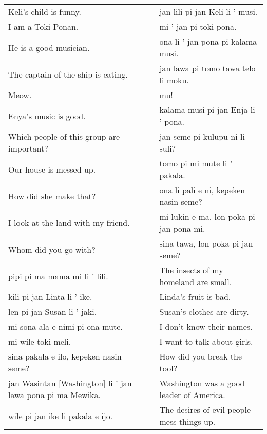 \begin{supertabular}{p{5,5cm}|ll}
Keli's child is funny.  && jan lili pi jan Keli li ' musi. \\ %
I am a Toki Ponan.  && mi ' jan pi toki pona. \\ %
He is a good musician.  && ona li ' jan pona pi kalama musi. \\ %
The captain of the ship is eating.  && jan lawa pi tomo tawa telo li moku. \\ %
Meow.  && mu! \\ %
Enya's music is good.  && kalama musi pi jan Enja li ' pona. \\ %
Which people of this group are important?  && jan seme pi kulupu ni li suli? \\ %
Our house is messed up.  && tomo pi mi mute li ' pakala. \\ %
How did she make that?  && ona li pali e ni, kepeken nasin seme? \\ %
I look at the land with my friend.  && mi lukin e ma, lon poka pi jan pona mi. \\ %
Whom did you go with?  && sina tawa, lon poka pi jan seme? \\ %
pipi pi ma mama mi li ' lili. && The insects of my homeland are small. \\
kili pi jan Linta li ' ike.  && Linda's fruit is bad. \\
len pi jan Susan li ' jaki.  && Susan's clothes are dirty. \\
mi sona ala e nimi pi ona mute.  && I don't know their names. \\
mi wile toki meli.  && I want to talk about girls. \\
sina pakala e ilo, kepeken nasin seme?  && How did you break the tool? \\
jan Wasintan [Washington] li ' jan lawa pona pi ma Mewika.  && Washington was a good leader of America. \\
wile pi jan ike li pakala e ijo.  && The desires of evil people mess things up. \\
\end{supertabular}  

